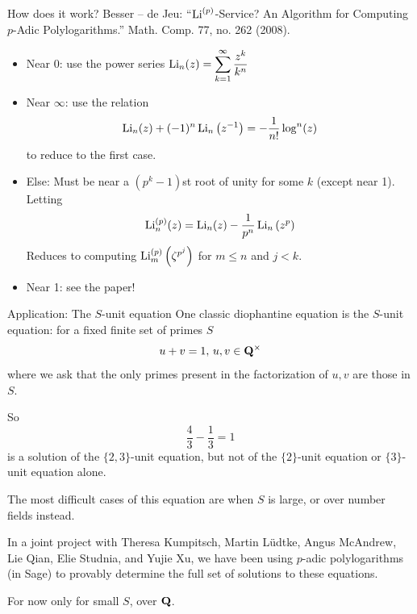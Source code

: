 \begin{frame}{How does it work?}
    Besser -- de Jeu: ``$\operatorname{Li}^{(p)} $-Service? An Algorithm for Computing $p$-Adic Polylogarithms.'' Math. Comp. 77, no. 262 (2008).

    \begin{itemize}
        \item Near 0: use the power series $\displaystyle\operatorname{Li}_{n}(z)=\sum_{k=1}^{\infty} \frac{z^{k}}{k^{n}}$
        \item Near $\infty $: use the relation
            \[ \operatorname{Li}_{n}(z)+(-1)^{n} \operatorname{Li}_{n}\left(z^{-1}\right)=-\frac{1}{n !} \log ^{n}(z)\]
            to reduce to the first case.\pause
        \item Else: Must be near a $(p^k-1)$st root of unity for some $k$ (except near 1).
            Letting
            \[\operatorname{Li}_{n}^{(p)}(z)=\operatorname{Li}_{n}(z)-\frac{1}{p^{n}} \operatorname{Li}_{n}\left(z^{p}\right)\]
            Reduces to computing $\operatorname{Li}_{m}^{(p)}\left(\zeta^{p^{j}}\right)$ for $m\le n$ and $j<k$.
        \item Near 1: see the paper!
    \end{itemize}

\end{frame}

\begin{frame}{Application: The $S$-unit equation}
    One classic diophantine equation is the $S$-unit equation: for a fixed finite set of primes $S$
    \[u + v = 1,\,u,v\in \mathbf Q^\times\]
    where we ask that the only primes present in the factorization of $u,v$ are those in $S$.\pause

    So
    \[\frac 43 - \frac13 = 1\]
    is a solution of the $\{2,3\}$-unit equation, but not of the $\{2\}$-unit equation or $\{3\}$-unit equation alone.

    The most difficult cases of this equation are when $S$ is large, or over number fields instead.
\end{frame}

\begin{frame}
    In a joint project with Theresa Kumpitsch,  Martin L\"udtke,  Angus McAndrew,  Lie Qian,  Elie Studnia, and Yujie Xu, we have been using $p$-adic polylogarithms (in Sage) to provably determine the full set of solutions to these equations.

    For now only for small $S$, over $\mathbf Q$.
\end{frame}

